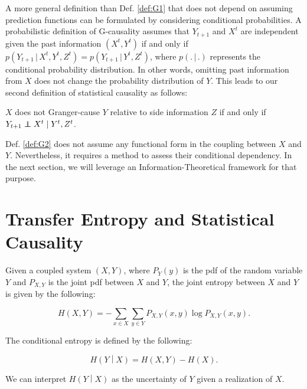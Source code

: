 \documentclass[]{book}
\theoremstyle{definition}
\theoremstyle{definition}
\theoremstyle{definition}
\theoremstyle{remark}
\let\BeginKnitrBlock\begin \let\EndKnitrBlock\end
\begin{document}
A more general definition than Def. \ref{def:G1} that does not depend on
assuming prediction functions can be formulated by considering
conditional probabilities. A probabilistic definition of G-causality
assumes that \(Y_{t+1}\) and \(X^{t}\) are independent given the past
information \((X^{t}, Y^{t})\) if and only if
\(p(Y_{t+1} \, | \, X^{t}, Y^{t}, Z^{t}) = p(Y_{t+1} \, | \, Y^{t}, Z^{t})\),
where \(p(. \, | \, .)\) represents the conditional probability
distribution. In other words, omitting past information from \(X\) does
not change the probability distribution of \(Y\). This leads to our
second definition of statistical causality as follows:

\BeginKnitrBlock{definition}
\protect\hypertarget{def:G2}{}{\label{def:G2} }\(X\) does not Granger-cause
\(Y\) relative to side information \(Z\) if and only if
\(Y_{t+1} \perp\!\!\!\!\perp X^{t} \; | \; Y^{t}, Z^{t}\).
\EndKnitrBlock{definition}

Def. \ref{def:G2} does not assume any functional form in the coupling
between \(X\) and \(Y\). Nevertheless, it requires a method to assess
their conditional dependency. In the next section, we will leverage an
Information-Theoretical framework for that purpose.

\section{Transfer Entropy and Statistical Causality}\label{nonlinearG}

Given a coupled system \((X,Y)\), where \(P_Y(y)\) is the pdf of the
random variable \(Y\) and \(P_{X,Y}\) is the joint pdf between \(X\) and
\(Y\), the joint entropy between \(X\) and \(Y\) is given by the
following:

\begin{equation}
H(X,Y) = -\sum_{x \in X}{\sum_{y \in Y}{P_{X,Y}(x,y)\log{P_{X,Y}(x,y)}}}.
\label{eq:HXY}
\end{equation}

The conditional entropy is defined by the following:

\begin{equation}
H\left(Y\middle\vert X\right) = H(X,Y) - H(X).
\end{equation}

We can interpret \(H\left(Y\middle\vert X\right)\) as the uncertainty of
\(Y\) given a realization of \(X\).
\end{document}
